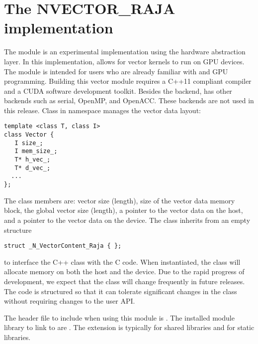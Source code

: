 %
\section{The NVECTOR\_RAJA implementation}\label{ss:nvec_raja}

The {\nvecraja} module is an experimental {\nvector} implementation using the
\href{https://software.llnl.gov/RAJA/}{\raja} hardware abstraction layer.
In this implementation, {\raja}
allows for {\sundials} vector kernels to run on GPU devices. The module is intended for users
who are already familiar with {\raja} and GPU programming. Building this vector
module requires a C++11 compliant compiler and a CUDA software development toolkit.
Besides the {\cuda} backend, {\raja} has other backends such as serial, OpenMP,
and OpenACC. These backends are not used in this {\sundials} release.
Class  in namespace  manages the vector data layout:
\begin{verbatim}
template <class T, class I>
class Vector {
   I size_;
   I mem_size_;
   T* h_vec_;
   T* d_vec_;
  ...
};
\end{verbatim}
The class members are: vector size (length), size of the vector data
memory block, the global vector size (length), a pointer to  the
vector data on the host, and a pointer to the vector data on the device.
The class  inherits from an empty structure
\begin{verbatim}
struct _N_VectorContent_Raja { };
\end{verbatim}
to interface the C++ class with the {\nvector} C code. When instantiated, the class
 will allocate memory on both the host and the device. Due to the rapid
progress of {\raja} development, we expect that the 
class will change frequently in future {\sundials} releases. The code is
structured so that it can tolerate significant changes in the
 class without requiring changes to the user API.


The header file to include when using this module is .
The installed module library to link to are .
The extension  is typically  for shared libraries and 
for static libraries.

